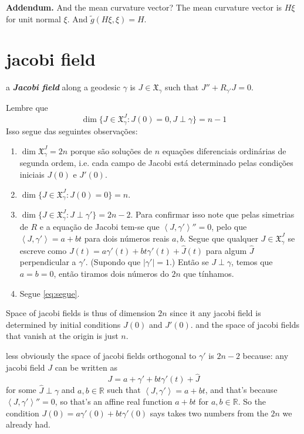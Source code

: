 \textbf{Addendum.} And the mean curvature vector? The mean curvature vector is \(H\xi\) for unit normal \(\xi\). And \(\tilde{g}(H\xi,\xi)=H\).
\section{jacobi field}

a \textit{\textbf{Jacobi field}} along a geodesic \(\gamma\) is \(J \in \mathfrak{X}_\gamma\) such that \(J''+R_{\gamma'}J=0\). 

Lembre que
	\begin{equation}\label{eq:segue}\dim\{J \in \mathfrak{X}^J_\gamma:J(0)=0, J \perp \gamma\}=n-1\end{equation}
Isso segue das seguintes observações:
\begin{enumerate}[label=(\alph*)]
\item \(\dim\mathfrak{X}^J_\gamma=2n\) porque são soluções de \(n\) equações diferenciais ordinárias de segunda ordem, i.e. cada campo de Jacobi está determinado pelas condições iniciais \(J(0)\) e \(J'(0)\). 
\item \(\dim \{J \in \mathfrak{X}^J_\gamma:J(0)=0\}=n\).
\item \(\dim \{J \in \mathfrak{X}^J_\gamma:J\perp \gamma'\}=2n-2\). Para confirmar isso note que pelas simetrias de \(R\) e a equação de Jacobi tem-se que \(\left<J,\gamma'\right>''=0\), pelo que \(\left<J,\gamma'\right>=a+bt\) para dois números reais \(a,b\). Segue que qualquer \(J \in \mathfrak{X}^J_\gamma\) se escreve como \(J(t)=a\gamma'(t)+bt\gamma'(t)+\hat{J}(t)\) para algum \(\hat{J}\) perpendicular a  \(\gamma'\). (Supondo que \(|\gamma'|=1\).) Então se \(J \perp \gamma\), temos que  \(a=b=0\), então tiramos dois números do \(2n\) que tínhamos.
\item Segue \cref{eq:segue}.
\end{enumerate}

Space of jacobi fields is thus of dimension \(2n\) since it any jacobi field is determined by initial conditions \(J(0)\) and \(J'(0)\). and the space of jacobi fields that vanish at the origin is just \(n\).

less obviously the space of jacobi fields orthogonal to  \(\gamma'\) is \(2n-2\) because: any jacobi field \(J\) can be written as
\[J=a+\gamma'+bt\gamma'(t)+\hat{J}\]
for some \(\hat{J}\perp \gamma\) and \(a,b \in \mathbb{R}\) such that \(\left<J,\gamma'\right>=a+bt\), and that's because \(\left<J,\gamma'\right>''=0\), so that's an affine real function \(a+bt\) for  \(a,b \in \mathbb{R}\). So the condition \(J(0)=a\gamma'(0)+bt\gamma'(0)\) says takes two numbers from the \(2n\) we already had.

